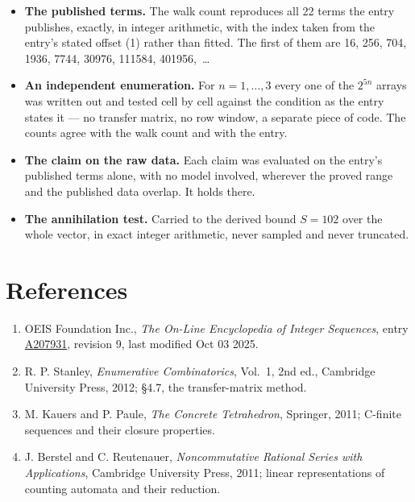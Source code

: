 \documentclass[11pt]{article}
\theoremstyle{definition}
\begin{document}
\begin{itemize}

\item {\bfseries The published terms.} The walk count reproduces all 22 terms the entry publishes, exactly, in integer arithmetic, with the index taken from the entry's stated offset (1) rather than fitted. The first of them are 16, 256, 704, 1936, 7744, 30976, 111584, 401956,~\dots

\item {\bfseries An independent enumeration.} For $n = 1,\dots,3$ every one of the $2^{5n}$ arrays was written out and tested cell by cell against the condition as the entry states it --- no transfer matrix, no row window, a separate piece of code. The counts agree with the walk count and with the entry.

\item {\bfseries The claim on the raw data.} Each claim was evaluated on the entry's published terms alone, with no model involved, wherever the proved range and the published data overlap. It holds there.

\item {\bfseries The annihilation test.} Carried to the derived bound $S = 102$ over the whole vector, in exact integer arithmetic, never sampled and never truncated.

\end{itemize}

\section{References}

\begin{enumerate}

\item OEIS Foundation Inc., \emph{The On-Line Encyclopedia of Integer Sequences}, entry \href{https://oeis.org/A207931}{A207931}, revision 9, last modified Oct 03 2025.

\item R. P. Stanley, \emph{Enumerative Combinatorics}, Vol.~1, 2nd ed., Cambridge University Press, 2012; \S4.7, the transfer-matrix method.

\item M. Kauers and P. Paule, \emph{The Concrete Tetrahedron}, Springer, 2011; C-finite sequences and their closure properties.

\item J. Berstel and C. Reutenauer, \emph{Noncommutative Rational Series with Applications}, Cambridge University Press, 2011; linear representations of counting automata and their reduction.

\end{enumerate}
\end{document}
